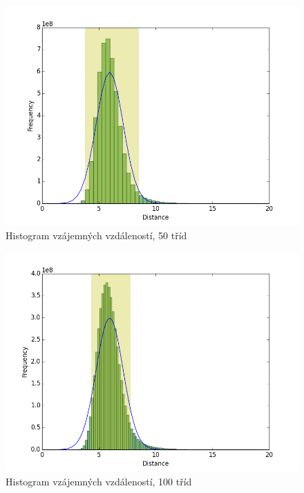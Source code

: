 \documentclass[fleqn,11pt]{article}
\begin{document}
    \begin{figure}[htp]
        \footnotesize
        \centering
        \caption*{Histogram vzájemných vzdáleností, 50 tříd}
        \includegraphics[width=13cm]{figures/enwiki-99k-50bins.png}
    \end{figure}

    \begin{figure}[htp]
        \footnotesize
        \centering
        \caption*{Histogram vzájemných vzdáleností, 100 tříd}
        \includegraphics[width=13cm]{figures/enwiki-99k-100bins.png}
    \end{figure}

    \renewcommand\refname{\section{Reference}}
    
    
\end{document}
